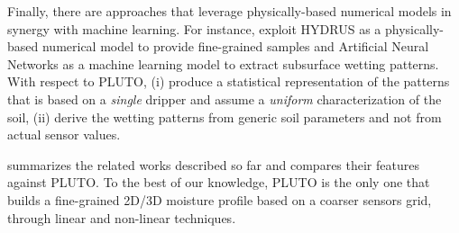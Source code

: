 Finally, there are approaches that leverage physically-based numerical models in synergy with machine learning.
For instance, \cite{Hinnell2010535} exploit HYDRUS as a physically-based numerical model to provide fine-grained samples and Artificial Neural Networks as a machine learning model to extract subsurface wetting patterns. With respect to PLUTO, \cite{Hinnell2010535} (i) produce a statistical representation of the patterns that is based on a \textit{single} dripper and assume a \textit{uniform} characterization of the soil, (ii) derive the wetting patterns from generic soil parameters and not from actual sensor values.

 summarizes the related works described so far and compares their features against PLUTO. 
To the best of our knowledge, PLUTO is the only one that builds a fine-grained 2D/3D moisture profile based on a coarser sensors grid, through linear and non-linear techniques.

